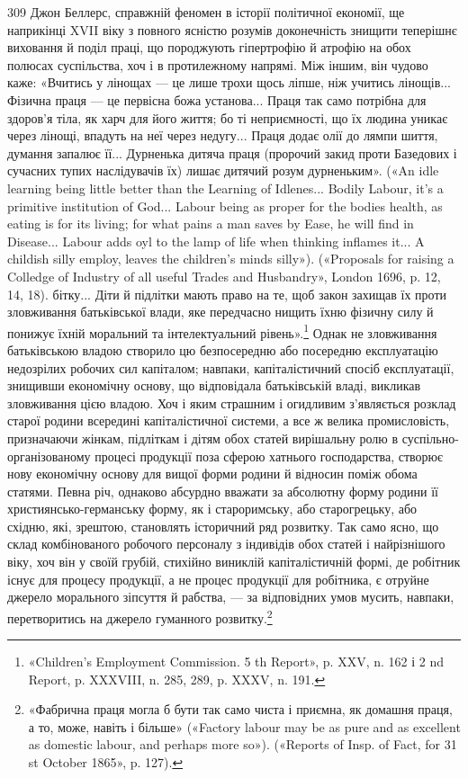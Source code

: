 309    Джон Беллерс, справжній феномен в історії політичної економії,
ще наприкінці XVII віку з повного ясністю розумів доконечність знищити
теперішнє виховання й поділ праці, що породжують гіпертрофію й атрофію
на обох полюсах суспільства, хоч і в протилежному напрямі. Між
іншим, він чудово каже: «Вчитись у лінощах — це лише трохи щось ліпше,
ніж учитись лінощів... Фізична праця — це первісна божа установа...
Праця так само потрібна для здоров’я тіла, як харч для його життя;
бо ті неприємності, що їх людина уникає через лінощі, впадуть на неї
через недугу... Праця додає олії до лямпи шиття, думання запалює її...
Дурненька дитяча праця (пророчий закид проти Базедових і сучасних
тупих наслідувачів їх) лишає дитячий розум дурненьким». («An idle
learning being little better than the Learning of Idlenes... Bodily Labour,
it’s a primitive institution of God... Labour being as proper for the
bodies health, as eating is for its living; for what pains a man saves by
Ease, he will find in Disease... Labour adds oyl to the lamp of life when
thinking inflames it... A childish silly employ, leaves the children’s minds
silly»). («Proposals for raising a Colledge of Industry of all useful Trades
and Husbandry», London 1696, p. 12, 14, 18).
бітку... Діти й підлітки мають право на те, щоб закон захищав їх
проти зловживання батьківської влади, яке передчасно нищить
їхню фізичну силу й понижує їхній моральний та інтелектуальний
рівень».\footnote{
«Children’s Employment Commission. 5 th Report», p. XXV,
n. 162 і 2 nd Report, p. XXXVIII, n. 285, 289, p. XXXV, n. 191.
} Однак не зловживання батьківською владою
створило цю безпосередню або посередню експлуатацію недозрілих
робочих сил капіталом; навпаки, капіталістичний спосіб
експлуатації, знищивши економічну основу, що відповідала батьківській
владі, викликав зловживання цією владою. Хоч і яким
страшним і огидливим з’являється розклад старої родини всередині
капіталістичної системи, а все ж велика промисловість,
призначаючи жінкам, підліткам і дітям обох статей вирішальну
ролю в суспільно-організованому процесі продукції поза сферою
хатнього господарства, створює нову економічну основу для
вищої форми родини й відносин поміж обома статями. Певна
річ, однаково абсурдно вважати за абсолютну форму родини її
християнсько-германську форму, як і староримську, або старогрецьку,
або східню, які, зрештою, становлять історичний ряд
розвитку. Так само ясно, що склад комбінованого робочого персоналу
з індивідів обох статей і найрізнішого віку, хоч він у своїй
грубій, стихійно виниклій капіталістичній формі, де робітник
існує для процесу продукції, а не процес продукції для робітника,
є отруйне джерело морального зіпсуття й рабства, — за відповідних
умов мусить, навпаки, перетворитись на джерело гуманного
розвитку.\footnote{
«Фабрична праця могла б бути так само чиста і приємна, як домашня
праця, а то, може, навіть і більше» («Factory labour may be as
pure and as excellent as domestic labour, and perhaps more so»). («Reports
of Insp. of Fact, for 31 st October 1865», p. 127).
}

